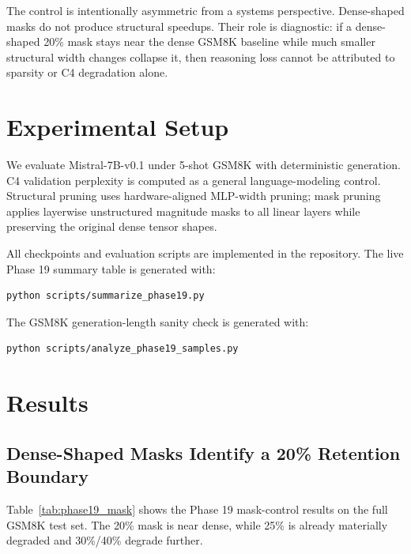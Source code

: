 \documentclass{article}
\begin{document}
The control is intentionally asymmetric from a systems perspective. Dense-shaped masks do not produce structural speedups. Their role is diagnostic: if a dense-shaped 20\% mask stays near the dense GSM8K baseline while much smaller structural width changes collapse it, then reasoning loss cannot be attributed to sparsity or C4 degradation alone.

\section{Experimental Setup}

We evaluate Mistral-7B-v0.1 under 5-shot GSM8K with deterministic generation. C4 validation perplexity is computed as a general language-modeling control. Structural pruning uses hardware-aligned MLP-width pruning; mask pruning applies layerwise unstructured magnitude masks to all linear layers while preserving the original dense tensor shapes.

All checkpoints and evaluation scripts are implemented in the repository. The live Phase 19 summary table is generated with:

\begin{verbatim}
python scripts/summarize_phase19.py
\end{verbatim}

The GSM8K generation-length sanity check is generated with:

\begin{verbatim}
python scripts/analyze_phase19_samples.py
\end{verbatim}

\section{Results}

\subsection{Dense-Shaped Masks Identify a 20\% Retention Boundary}

Table~\ref{tab:phase19_mask} shows the Phase 19 mask-control results on the full GSM8K test set. The 20\% mask is near dense, while 25\% is already materially degraded and 30\%/40\% degrade further.
\end{document}
